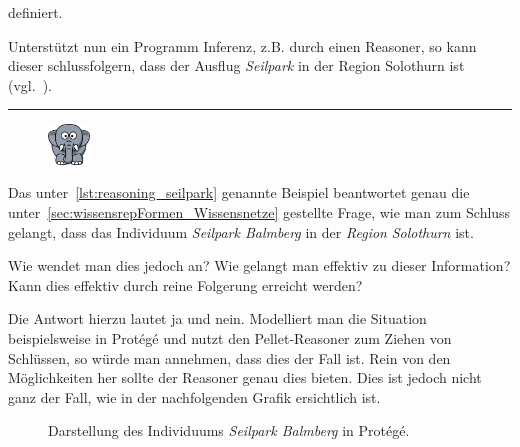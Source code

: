 definiert.

Unterstützt nun ein Programm Inferenz, z.B. durch einen Reasoner, so kann dieser schlussfolgern, dass der Ausflug \textit{Seilpark} in der Region Solothurn ist (vgl.~\cite[Abschnitt `Examples']{w3inference}).

\newpage

\noindent\rule[1ex]{\textwidth}{1pt}
\begin{figure}
    \vspace{-12pt}
    \includegraphics[width=0.1\textwidth]{bilder/elephant.png}
\end{figure}
Das unter~\ref{lst:reasoning_seilpark} genannte Beispiel beantwortet genau die unter~\ref{sec:wissensrepFormen_Wissensnetze} gestellte Frage, wie man zum Schluss gelangt, dass das Individuum \textit{Seilpark Balmberg} in der \textit{Region} \textit{Solothurn} ist.

Wie wendet man dies jedoch an? Wie gelangt man effektiv zu dieser Information? Kann dies effektiv durch reine Folgerung erreicht werden?

Die Antwort hierzu lautet ja und nein. Modelliert man die Situation beispielsweise in Protégé und nutzt den Pellet-Reasoner zum Ziehen von Schlüssen, so würde man annehmen, dass dies der Fall ist. Rein von den Möglichkeiten her sollte der Reasoner genau dies bieten. Dies ist jedoch nicht ganz der Fall, wie in der nachfolgenden Grafik ersichtlich ist.

\begin{figure}[H]
\centering {}
\caption{Darstellung des Individuums \textit{Seilpark Balmberg} in Protégé.\label{fig:inferenz_protege}\protect\footnotemark}
\end{figure}

